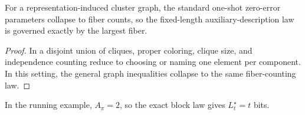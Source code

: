 \begin{corollary}
For a representation-induced cluster graph, the standard one-shot zero-error parameters collapse to fiber counts, so the fixed-length auxiliary-description law is governed exactly by the largest fiber.
\end{corollary}

\begin{proof}
In a disjoint union of cliques, proper coloring, clique size, and independence counting reduce to choosing or naming one element per component. In this setting, the general graph inequalities collapse to the same fiber-counting law.
\end{proof}

In the running example, $A_\pi = 2$, so the exact block law gives $L_t^\star = t$ bits.
